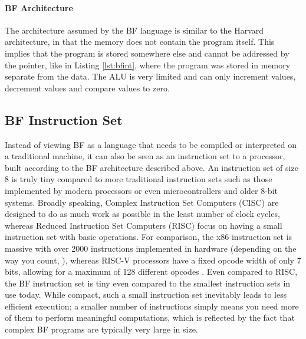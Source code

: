 \paragraph{BF Architecture} The architecture assumed by the BF language is similar to the Harvard architecture, in that the memory does not contain the program itself. This implies that the program is stored somewhere else and cannot be addressed by the pointer, like in Listing \ref{lst:bfint}, where the program was stored in memory separate from the data. The ALU is very limited and can only increment values, decrement values and compare values to zero.


\subsection{BF Instruction Set}
Instead of viewing BF as a language that needs to be compiled or interpreted on a traditional machine, it can also be seen as an instruction set to a processor, built according to the BF architecture described above. An instruction set of size 8 is truly tiny compared to more traditional instruction sets such as those implemented by modern processors or even microcontrollers and older 8-bit systems. Broadly speaking, Complex Instruction Set Computers (CISC) are designed to do as much work as possible in the least number of clock cycles, whereas Reduced Instruction Set Computers (RISC) focus on having a small instruction set with basic operations. For comparison, the x86 instruction set is massive with over 2000 instructions implemented in hardware (depending on the way you count, \cite{stefanheule}), whereas RISC-V processors have a fixed opcode width of only 7 bits, allowing for a maximum of 128 different opcodes \cite{danielmangum}. Even compared to RISC, the BF instruction set is tiny even compared to the smallest instruction sets in use today. While compact, such a small instruction set inevitably leads to less efficient execution; a smaller number of instructions simply means you need more of them to perform meaningful computations, which is reflected by the fact that complex BF programs are typically very large in size.

